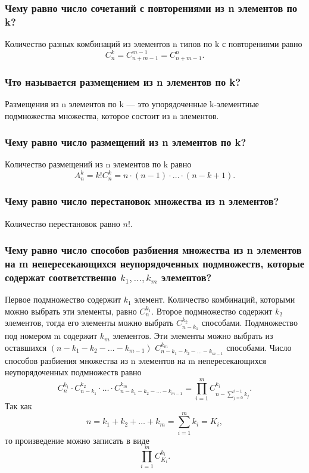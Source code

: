 \documentclass{book}
\begin{document}
\subsubsection*{Чему равно число сочетаний с повторениями из n элементов по k?}

Количество разных комбинаций из элементов n типов по k с повторениями равно $$C_n^k=C_{n+m-1}^{m-1}=C_{n+m-1}^n.$$

\subsubsection*{Что называется размещением из n элементов по k?}

Размещения из n элементов по k --- это упорядоченные k-элементные подмножества множества, которое состоит из n элементов.

\subsubsection*{Чему равно число размещений из n элементов по k?}

Количество размещений из n элементов по k равно $$A_n^k=k!C_n^k=n\cdot(n-1)\cdot \dotsc \cdot(n-k+1).$$

\subsubsection*{Чему равно число перестановок множества из n элементов?}

Количество перестановок равно $n!$.

\subsubsection*{Чему равно число способов разбиения множества из n элементов на m непересекающихся неупорядоченных подмножеств, которые содержат соответственно $k_1,  \dotsc , k_m$ элементов?}

Первое подмножество содержит $k_1$ элемент. Количество комбинаций, которыми можно выбрать эти элементы, равно $C_n^{k_1}$. Второе подмножество содержит $k_2$ элементов, тогда его элементы можно выбрать $C_{n-k_1}^{k_2}$ способами. Подмножество под номером m содержит $k_m$ элементов. Эти элементы можно выбрать из оставшихся $\left(n-k_1-k_2- \dotsc -k_{m-1}\right)$ $C_{n-k_1-k_2- \dotsc -k_{m-1}}^{k_m}$ способами. Число способов разбиения множества из n элементов на m непересекающихся неупорядоченных подмножеств равно $$C_n^{k_1}\cdot C_{n-k_1}^{k_2}\cdot \dotsc \cdot C_{n-k_1-k_2- \dotsc -k_{m-1}}^{k_m}=\prod\limits_{i=1}^mC_{n-\sum\limits_{j=0}^{i-1}k_j}^{k_i}.$$ Так как $$n=k_1+k_2+ \dotsc +k_m=\sum\limits_{i=1}^m k_i=K_i,$$ то произведение можно записать в виде $$\prod\limits_{i=1}^mC_{K_i}^{k_i}.$$
\end{document}

